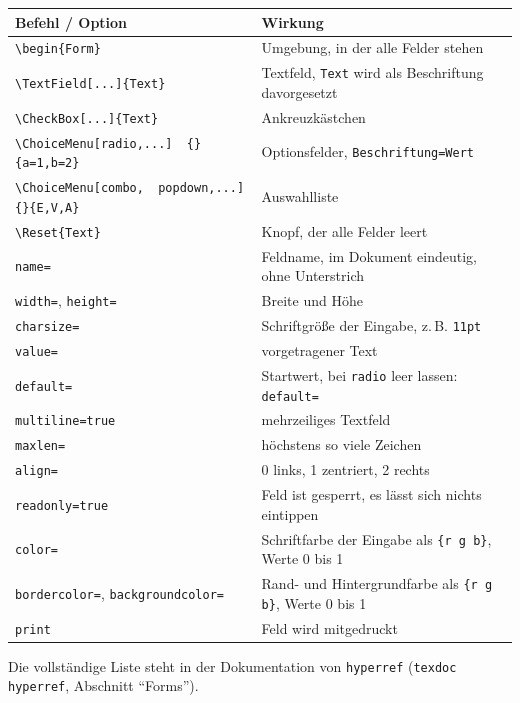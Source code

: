 \begin{Form}
\begin{tabular}{p{5.6cm} p{10cm}}
	\toprule
	\textbf{Befehl / Option} & \textbf{Wirkung} \\
	\midrule
	\verb|\begin{Form}| & Umgebung, in der alle Felder stehen \\
	\verb|\TextField[...]{Text}| & Textfeld, \texttt{Text} wird als Beschriftung davorgesetzt \\
	\verb|\CheckBox[...]{Text}| & Ankreuzkästchen \\
	\verb|\ChoiceMenu[radio,...]|\newline\verb|  {}{a=1,b=2}| & Optionsfelder, \texttt{Beschriftung=Wert} \\
	\verb|\ChoiceMenu[combo,|\newline\verb|  popdown,...]{}{E,V,A}| & Auswahlliste \\
	\verb|\Reset{Text}| & Knopf, der alle Felder leert \\
	\midrule
	\texttt{name=} & Feldname, im Dokument eindeutig, ohne Unterstrich \\
	\texttt{width=}, \texttt{height=} & Breite und Höhe \\
	\texttt{charsize=} & Schriftgröße der Eingabe, z.\,B. \texttt{11pt} \\
	\texttt{value=} & vorgetragener Text \\
	\texttt{default=} & Startwert, bei \texttt{radio} leer lassen: \texttt{default=} \\
	\texttt{multiline=true} & mehrzeiliges Textfeld \\
	\texttt{maxlen=} & höchstens so viele Zeichen \\
	\texttt{align=} & 0 links, 1 zentriert, 2 rechts \\
	\texttt{readonly=true} & Feld ist gesperrt, es lässt sich nichts eintippen \\
	\texttt{color=} & Schriftfarbe der Eingabe als \texttt{\{r g b\}}, Werte 0 bis 1 \\
	\texttt{bordercolor=}, \texttt{backgroundcolor=} & Rand- und Hintergrundfarbe als \texttt{\{r g b\}}, Werte 0 bis 1 \\
	\texttt{print} & Feld wird mitgedruckt \\
	\bottomrule
\end{tabular}

Die vollständige Liste steht in der Dokumentation von \texttt{hyperref}
(\texttt{texdoc hyperref}, Abschnitt \enquote{Forms}).




\end{Form}
